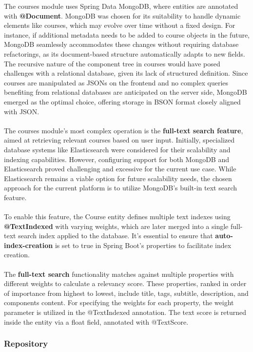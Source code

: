 \noindent The courses module uses Spring Data MongoDB, where entities are annotated with \textbf{@Document}. MongoDB was chosen for its suitability to handle dynamic elements like courses, which may evolve over time without a fixed design. For instance, if additional metadata needs to be added to course objects in the future, MongoDB seamlessly accommodates these changes without requiring database refactorings, as its document-based structure automatically adapts to new fields. The recursive nature of the component tree in courses would have posed challenges with a relational database, given its lack of structured definition. Since courses are manipulated as JSONs on the frontend and no complex queries benefiting from relational databases are anticipated on the server side, MongoDB emerged as the optimal choice, offering storage in BSON format closely aligned with JSON.
\\\\
\noindent The courses module's most complex operation is the \textbf{full-text search feature}, aimed at retrieving relevant courses based on user input. Initially, specialized database systems like Elasticsearch were considered for their scalability and indexing capabilities. However, configuring support for both MongoDB and Elasticsearch proved challenging and excessive for the current use case. While Elasticsearch remains a viable option for future scalability needs, the chosen approach for the current platform is to utilize MongoDB's built-in text search feature.
\\\\
\noindent To enable this feature, the Course entity defines multiple text indexes using \textbf{@TextIndexed} with varying weights, which are later merged into a single full-text search index applied to the database. It's essential to ensure that \textbf{auto-index-creation} is set to true in Spring Boot's properties to facilitate index creation.
\\\\
\noindent The \textbf{full-text search} functionality matches against multiple properties with different weights to calculate a relevancy score. These properties, ranked in order of importance from highest to lowest, include title, tags, subtitle, description, and components content. For specifying the weights for each property, the weight parameter is utilized in the @TextIndexed annotation. The text score is returned inside the entity via a float field, annotated with @TextScore.

\subsubsection{Repository}

